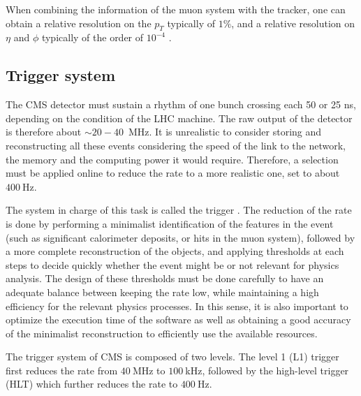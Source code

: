     When combining the information of the muon system with the tracker, one can
    obtain a relative resolution on the $p_T$ typically of $1\%$, and a relative
    resolution on $\eta$ and $\phi$ typically of the order of $10^{-4}$
    \cite{CMStracking}.

    \subsection{Trigger system}

    The CMS detector must sustain a rhythm of one bunch crossing each 50 or 25
    ns, depending on the condition of the LHC machine. The raw output of the
    detector is therefore about $\sim 20-40$~MHz. It is unrealistic to consider
    storing and reconstructing all these events considering the speed of the
    link to the network, the memory and the computing power it would require.
    Therefore, a selection must be applied online to reduce the rate to a more
    realistic one, set to about $400~$Hz.

    The system in charge of this task is called the trigger \cite{CMStrigger}.
    The reduction of the rate is done by performing a minimalist identification
    of the features in the event (such as significant calorimeter deposits, or
    hits in the muon system), followed by a more complete reconstruction of the
    objects, and applying thresholds at each steps to decide quickly whether the
    event might be or not relevant for physics analysis.  The design of these
    thresholds must be done carefully to have an adequate balance between
    keeping the rate low, while maintaining a high efficiency for the relevant
    physics processes. In this sense, it is also important to optimize the
    execution time of the software as well as obtaining a good accuracy of the
    minimalist reconstruction to efficiently use the available resources.

    The trigger system of CMS is composed of two levels. The level 1 (L1)
    trigger first reduces the rate from $40~$MHz to $100~$kHz, followed by the
    high-level trigger (HLT) which further reduces the rate to $400~$Hz.


